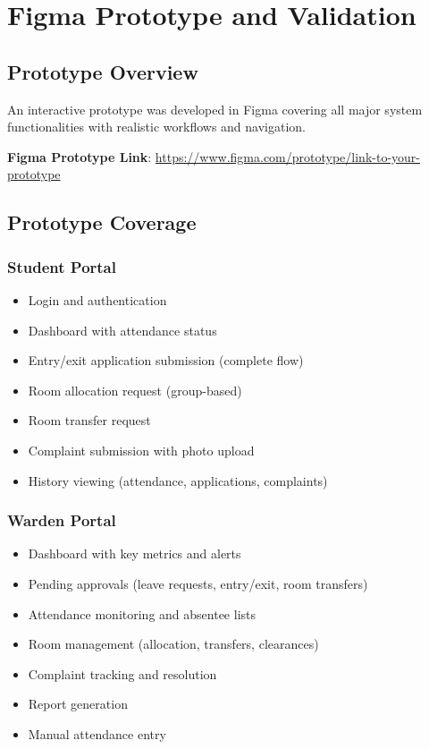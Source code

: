 \documentclass[12pt]{article}
\begin{document}
\newpage
\section{Figma Prototype and Validation}

\subsection{Prototype Overview}

An interactive prototype was developed in Figma covering all major system functionalities with realistic workflows and navigation.

\textbf{Figma Prototype Link}: \url{https://www.figma.com/prototype/link-to-your-prototype}

\subsection{Prototype Coverage}

\subsubsection{Student Portal}

\begin{itemize}
\item Login and authentication
\item Dashboard with attendance status
\item Entry/exit application submission (complete flow)
\item Room allocation request (group-based)
\item Room transfer request
\item Complaint submission with photo upload
\item History viewing (attendance, applications, complaints)
\end{itemize}

\subsubsection{Warden Portal}

\begin{itemize}
\item Dashboard with key metrics and alerts
\item Pending approvals (leave requests, entry/exit, room transfers)
\item Attendance monitoring and absentee lists
\item Room management (allocation, transfers, clearances)
\item Complaint tracking and resolution
\item Report generation
\item Manual attendance entry
\end{itemize}
\end{document}

